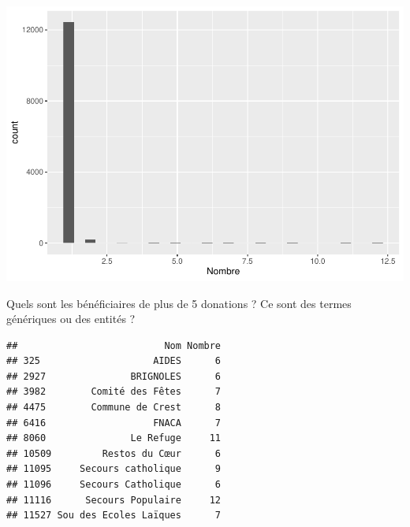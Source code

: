 \documentclass[
]{book}
\newenvironment{Shaded}{\begin{snugshade}}{\end{snugshade}}
\newcommand{\AttributeTok}[1]{\textcolor[rgb]{0.13,0.29,0.53}{#1}}
\newcommand{\DecValTok}[1]{\textcolor[rgb]{0.00,0.00,0.81}{#1}}
\newcommand{\FunctionTok}[1]{\textcolor[rgb]{0.13,0.29,0.53}{\textbf{#1}}}
\newcommand{\NormalTok}[1]{#1}
\newcommand{\OtherTok}[1]{\textcolor[rgb]{0.56,0.35,0.01}{#1}}
\newcommand{\SpecialCharTok}[1]{\textcolor[rgb]{0.81,0.36,0.00}{\textbf{#1}}}
\begin{document}
\includegraphics{_main_files/figure-latex/reserve1-1.pdf}

Quels sont les bénéficiaires de plus de 5 donations ? Ce sont des termes génériques
ou des entités ?

\begin{Shaded}
\end{Shaded}

\begin{verbatim}
##                          Nom Nombre
## 325                    AIDES      6
## 2927               BRIGNOLES      6
## 3982        Comité des Fêtes      7
## 4475        Commune de Crest      8
## 6416                   FNACA      7
## 8060               Le Refuge     11
## 10509         Restos du Cœur      6
## 11095     Secours catholique      9
## 11096     Secours Catholique      6
## 11116      Secours Populaire     12
## 11527 Sou des Ecoles Laïques      7
\end{verbatim}

\begin{Shaded}
\end{Shaded}
\end{document}
